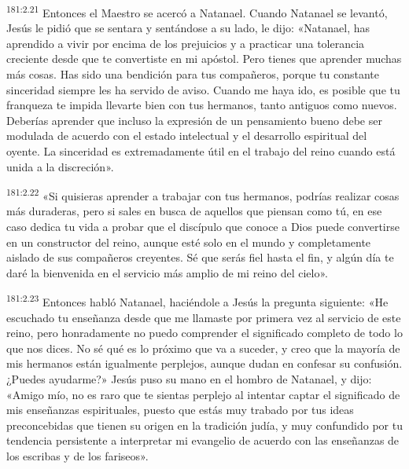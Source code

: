 \par 
\textsuperscript{181:2.21} Entonces el Maestro se acercó a Natanael. Cuando Natanael se levantó, Jesús le pidió que se sentara y sentándose a su lado, le dijo: «Natanael, has aprendido a vivir por encima de los prejuicios y a practicar una tolerancia creciente desde que te convertiste en mi apóstol. Pero tienes que aprender muchas más cosas. Has sido una bendición para tus compañeros, porque tu constante sinceridad siempre les ha servido de aviso. Cuando me haya ido, es posible que tu franqueza te impida llevarte bien con tus hermanos, tanto antiguos como nuevos. Deberías aprender que incluso la expresión de un pensamiento bueno debe ser modulada de acuerdo con el estado intelectual y el desarrollo espiritual del oyente. La sinceridad es extremadamente útil en el trabajo del reino cuando está unida a la discreción».

\par 
\textsuperscript{181:2.22} «Si quisieras aprender a trabajar con tus hermanos, podrías realizar cosas más duraderas, pero si sales en busca de aquellos que piensan como tú, en ese caso dedica tu vida a probar que el discípulo que conoce a Dios puede convertirse en un constructor del reino, aunque esté solo en el mundo y completamente aislado de sus compañeros creyentes. Sé que serás fiel hasta el fin, y algún día te daré la bienvenida en el servicio más amplio de mi reino del cielo».

\par 
\textsuperscript{181:2.23} Entonces habló Natanael, haciéndole a Jesús la pregunta siguiente: «He escuchado tu enseñanza desde que me llamaste por primera vez al servicio de este reino, pero honradamente no puedo comprender el significado completo de todo lo que nos dices. No sé qué es lo próximo que va a suceder, y creo que la mayoría de mis hermanos están igualmente perplejos, aunque dudan en confesar su confusión. ¿Puedes ayudarme?» Jesús puso su mano en el hombro de Natanael, y dijo: «Amigo mío, no es raro que te sientas perplejo al intentar captar el significado de mis enseñanzas espirituales, puesto que estás muy trabado por tus ideas preconcebidas que tienen su origen en la tradición judía, y muy confundido por tu tendencia persistente a interpretar mi evangelio de acuerdo con las enseñanzas de los escribas y de los fariseos».

